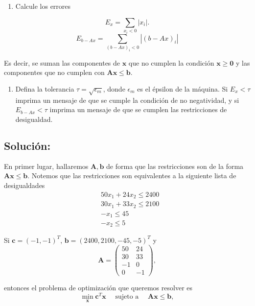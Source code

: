 \documentclass[11pt]{article}
\providecommand{\tightlist}{%
      \setlength{\itemsep}{0pt}\setlength{\parskip}{0pt}}
\begin{document}
\begin{enumerate}
\def\labelenumi{\arabic{enumi}.}
\setcounter{enumi}{3}
\tightlist
\item
  Calcule los errores
\end{enumerate}

\[ E_x = \sum_{x_i<0} |x_i|. \]
\[ E_{b-Ax} = \sum_{(b-Ax)_i<0} |(b-Ax)_i|\]

Es decir, se suman las componentes de \(\mathbf{x}\) que no cumplen la
condición \(\mathbf{x}\geq \mathbf{0}\) y las componentes que no cumplen
con \(\mathbf{A}\mathbf{x}\leq \mathbf{b}\).

\begin{enumerate}
\def\labelenumi{\arabic{enumi}.}
\setcounter{enumi}{4}
\tightlist
\item
  Defina la tolerancia \(\tau=\sqrt{\epsilon_m}\), donde \(\epsilon_m\)
  es el épsilon de la máquina. Si \(E_x<\tau\) imprima un mensaje de que
  se cumple la condición de no negatividad, y si \(E_{b-Ax}<\tau\)
  imprima un mensaje de que se cumplen las restricciones de desigualdad.
\end{enumerate}

\hypertarget{soluciuxf3n}{%
\subsection{Solución:}\label{soluciuxf3n}}

    En primer lugar, hallaremos \(\mathbf{A},\mathbf{b}\) de forma que las
restricciones son de la forma \(\mathbf{A}\mathbf{x}\leq\mathbf{b}\).
Notemos que las restricciones son equivalentes a la siguiente lista de
desigualdades \[
\begin{array}{rl}
     & 50x_1 + 24x_2 \leq 2400 \\
     & 30x_1 + 33x_2 \leq 2100 \\
     & -x_1 \leq 45 \\
     & -x_2 \leq 5
\end{array}
\]

Si \(\mathbf{c}=(-1,-1)^T\), \(\mathbf{b}=(2400,2100,-45,-5)^T\) y \[ 
\mathbf{A}=\begin{pmatrix}
50 & 24\\
30 & 33\\
-1 & 0\\
 0 & -1
\end{pmatrix},
\]

entonces el problema de optimización que queremos resolver es \[ 
\min_{\mathbf{x}}\mathbf{c}^T\mathbf{x}\quad\text{ sujeto a }\quad \mathbf{A}\mathbf{x}\leq \mathbf{b},
\]
\end{document}
